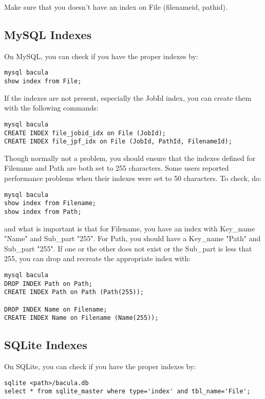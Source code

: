 Make sure that you doesn't have an index on File (filenameid, pathid).

\subsection{MySQL Indexes}
On MySQL, you can check if you have the proper indexes by:

\footnotesize
\begin{verbatim}
mysql bacula
show index from File;
\end{verbatim}
\normalsize

If the indexes are not present, especially the JobId index, you can
create them with the following commands:

\footnotesize
\begin{verbatim}
mysql bacula
CREATE INDEX file_jobid_idx on File (JobId);
CREATE INDEX file_jpf_idx on File (JobId, PathId, FilenameId);
\end{verbatim}
\normalsize

Though normally not a problem, you should ensure that the indexes 
defined for Filename and Path are both set to 255 characters. Some users 
reported performance problems when their indexes were set to 50 characters.
To check, do:

\footnotesize
\begin{verbatim}
mysql bacula
show index from Filename;
show index from Path;
\end{verbatim}
\normalsize

and what is important is that for Filename, you have an index with
Key\_name "Name" and Sub\_part "255". For Path, you should have a Key\_name
"Path" and Sub\_part "255".  If one or the other does not exist or the
Sub\_part is less that 255, you can drop and recreate the appropriate
index with:

\footnotesize
\begin{verbatim}
mysql bacula
DROP INDEX Path on Path;
CREATE INDEX Path on Path (Path(255));

DROP INDEX Name on Filename;
CREATE INDEX Name on Filename (Name(255));
\end{verbatim}
\normalsize


\subsection{SQLite Indexes}
On SQLite, you can check if you have the proper indexes by:

\footnotesize
\begin{verbatim}
sqlite <path>/bacula.db
select * from sqlite_master where type='index' and tbl_name='File';
\end{verbatim}
\normalsize

